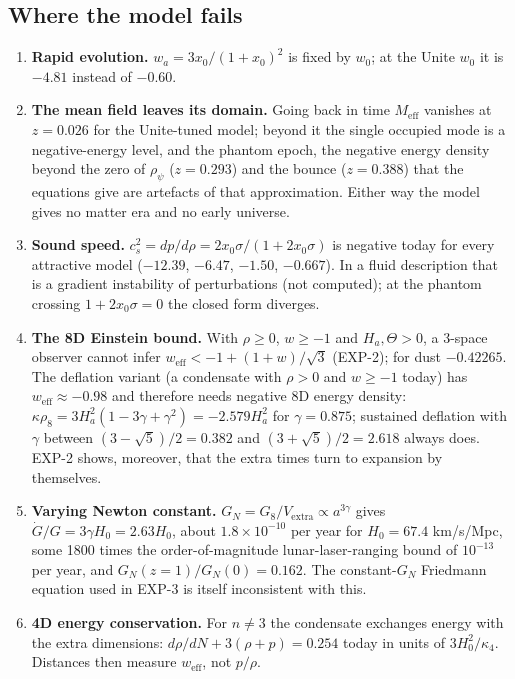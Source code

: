 \documentclass[11pt]{article}
\begin{document}
\subsection{Where the model fails}

\begin{enumerate}
\item \textbf{Rapid evolution.} $w_a=3x_0/(1+x_0)^2$ is fixed by $w_0$; at the Unite $w_0$ it is $-4.81$ instead of $-0.60$.
\item \textbf{The mean field leaves its domain.} Going back in time $M_{\mathrm{eff}}$ vanishes at $z=0.026$ for the Unite-tuned model; beyond it the single occupied mode is a negative-energy level, and the phantom epoch, the negative energy density beyond the zero of $\rho_\psi$ ($z=0.293$) and the bounce ($z=0.388$) that the equations give are artefacts of that approximation. Either way the model gives no matter era and no early universe.
\item \textbf{Sound speed.} $c_s^2=dp/d\rho=2x_0\sigma/(1+2x_0\sigma)$ is negative today for every attractive model ($-12.39$, $-6.47$, $-1.50$, $-0.667$). In a fluid description that is a gradient instability of perturbations (not computed); at the phantom crossing $1+2x_0\sigma=0$ the closed form diverges.
\item \textbf{The 8D Einstein bound.} With $\rho\ge0$, $w\ge-1$ and $H_a,\Theta>0$, a 3-space observer cannot infer $w_{\mathrm{eff}}<-1+(1+w)/\sqrt3$ (EXP-2); for dust $-0.42265$. The deflation variant (a condensate with $\rho>0$ and $w\ge-1$ today) has $w_{\mathrm{eff}}\approx-0.98$ and therefore needs negative 8D energy density: $\kappa\rho_8=3H_a^2(1-3\gamma+\gamma^2)=-2.579H_a^2$ for $\gamma=0.875$; sustained deflation with $\gamma$ between $(3-\sqrt5)/2=0.382$ and $(3+\sqrt5)/2=2.618$ always does. EXP-2 shows, moreover, that the extra times turn to expansion by themselves.
\item \textbf{Varying Newton constant.} $G_N=G_8/V_{\mathrm{extra}}\propto a^{3\gamma}$ gives $\dot G/G=3\gamma H_0=2.63H_0$, about $1.8\times10^{-10}$ per year for $H_0=67.4$ km/s/Mpc, some 1800 times the order-of-magnitude lunar-laser-ranging bound of $10^{-13}$ per year, and $G_N(z=1)/G_N(0)=0.162$. The constant-$G_N$ Friedmann equation used in EXP-3 is itself inconsistent with this.
\item \textbf{4D energy conservation.} For $n\ne3$ the condensate exchanges energy with the extra dimensions: $d\rho/dN+3(\rho+p)=0.254$ today in units of $3H_0^2/\kappa_4$. Distances then measure $w_{\mathrm{eff}}$, not $p/\rho$.

\end{enumerate}
\end{document}
